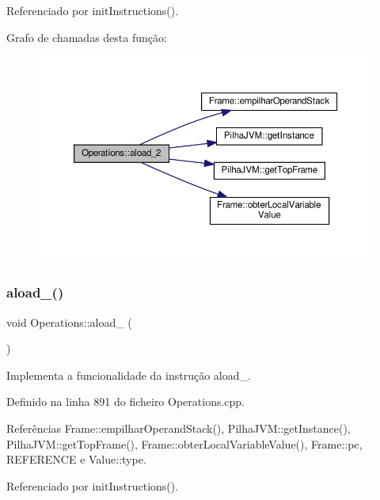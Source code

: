 Referenciado por init\+Instructions().

Grafo de chamadas desta função\+:\nopagebreak
\begin{figure}[H]
\begin{center}
\leavevmode
\includegraphics[width=350pt]{classOperations_abd58f463152d7f88b9fb2f133c6ca184_cgraph}
\end{center}
\end{figure}
\mbox{\label{classOperations_ac0cadd4fe7c17eab1985f11b5389fafc}} 
\subsubsection{\texorpdfstring{aload\+\_()}{aload\_3()}}
{\footnotesize\ttfamily void Operations\+::aload\+\_ (\begin{DoxyParamCaption}{ }\end{DoxyParamCaption})\hspace{0.3cm}{\ttfamily [private]}}



Implementa a funcionalidade da instrução aload\+\_. 



Definido na linha 891 do ficheiro Operations.\+cpp.



Referências Frame\+::empilhar\+Operand\+Stack(), Pilha\+J\+V\+M\+::get\+Instance(), Pilha\+J\+V\+M\+::get\+Top\+Frame(), Frame\+::obter\+Local\+Variable\+Value(), Frame\+::pc, R\+E\+F\+E\+R\+E\+N\+CE e Value\+::type.



Referenciado por init\+Instructions().

